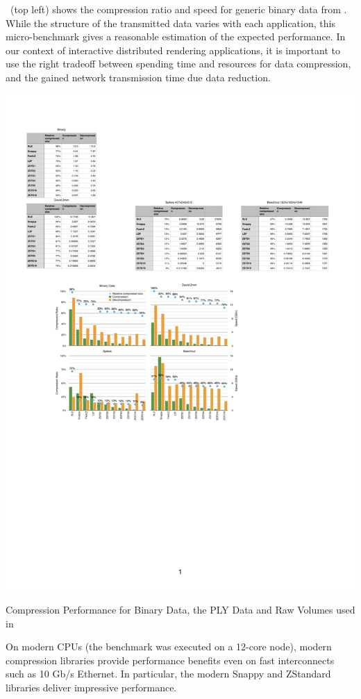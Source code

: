 ~(top left) shows the compression ratio and speed for
generic binary data from \cite{ESP:18}. While the structure of the transmitted
data varies with each application, this micro-bench\-mark gives a reasonable
estimation of the expected performance. In our context of interactive
distributed rendering applications, it is important to use the right tradeoff
between spending time and resources for data compression, and the gained
network transmission time due data reduction.

\begin{benchmark}[h!t]\center
  \includegraphics[width=\textwidth]{results/compressorDetail}
  \caption{\label{rCompressorDetail}Compression Performance for Binary Data, the PLY Data and Raw Volumes used in }
\end{benchmark}

On modern CPUs (the benchmark was executed on a 12-core node), modern
compression libraries provide performance benefits even on fast interconnects
such as 10 Gb/s Ethernet. In particular, the modern Snappy and ZStandard
libraries deliver impressive performance.

